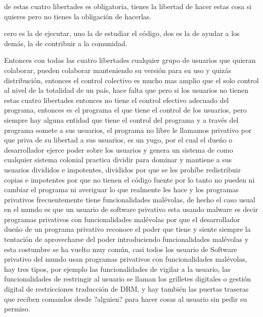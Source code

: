 \begin{multicols}{2}
de estas cuatro libertades es obligatoria, tienes la libertad de hacer estas cosa si quieres pero no tienes la obligación de hacerlas.


\begin{entradilla} %
{\em {\color{introcolor}{Libertades esenciales: }}}cero es la de ejecutar, uno la de estudiar el código, dos es la de ayudar a los demás, la de contribuir a la comunidad.
\end{entradilla}

Entonces con todas las cuatro libertades cualquier grupo de usuarios que quieran colaborar, pueden colaborar manteniendo su versión para su uso y quizás distribución, entonces el control colectivo es mucho mas amplio que el solo control al nivel de la totalidad de un país, hace falta que {\em {\color{introcolor}{cualquier grupo pueda tener el control de la versión que usa, }}} pero si los usuarios no tienen estas cuatro libertades entonces no tiene el control efectivo adecuado del programa, entonces es el programa el que tiene el control de los usuarios, pero siempre hay alguna entidad que tiene el control del programa y a través del programa somete a sus usuarios, el programa no libre le llamamos  privativo por que priva de su libertad a sus usuarios, es un yugo, {\em {\color{introcolor}{un instrumento de poder, genera este sistema de poder injusto }}} por el cual el dueńo o desarrollador ejerce poder sobre los usuarios y genera un sistema de {\em {\color{introcolor}{colonización digital, }}}como cualquier sistema colonial practica dividir para dominar y mantiene a sus usuarios divididos e impotentes, divididos por que se les prohíbe redistribuir copias e impotentes por que no tienen el código fuente por lo tanto no pueden ni cambiar el programa  ni averiguar lo que realmente les hace y los programas privativos frecuentemente tiene funcionalidades malévolas, de hecho el caso usual en el mundo es que un usuario de software privativo esta usando malware es decir programas privativos con funcionalidades malévolas por que el desarrollador dueńo de un programa privativo reconoce el poder que tiene y siente siempre la tentación de aprovecharse del poder introduciendo funcionalidades malévolas  y esta costumbre se ha vuelto muy común, casi todos los usuario de Software privativo del mundo usan programas privativos con funcionalidades malévolas, hay tres tipos, por ejemplo las funcionalidades de vigilar a la usuario, las funcionalidades de restringir al usuario se llaman los grilletes digitales o gestión digital de restricciones traducción de DRM, y hay también las puertas traseras que reciben comandos desde ?alguien? para hacer cosas al usuario sin pedir su permiso. 


\end{multicols}

